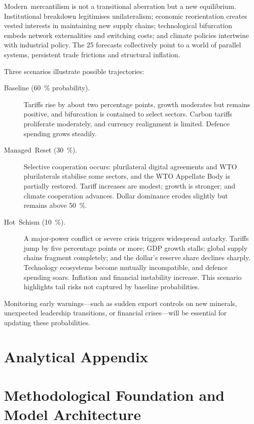 \documentclass{article}
\begin{document}
Modern mercantilism is not a transitional aberration but a new equilibrium.  Institutional breakdown legitimises unilateralism; economic reorientation creates vested interests in maintaining new supply chains; technological bifurcation embeds network externalities and switching costs; and climate policies intertwine with industrial policy.  The 25 forecasts collectively point to a world of parallel systems, persistent trade frictions and structural inflation.

Three scenarios illustrate possible trajectories:

\begin{description}
\item[Baseline (60 \% probability).]  Tariffs rise by about two percentage points, growth moderates but remains positive, and bifurcation is contained to select sectors.  Carbon tariffs proliferate moderately, and currency realignment is limited.  Defence spending grows steadily.

\item[Managed Reset (30 \%).]  Selective cooperation occurs: plurilateral digital agreements and WTO plurilaterals stabilise some sectors, and the WTO Appellate Body is partially restored.  Tariff increases are modest; growth is stronger; and climate cooperation advances.  Dollar dominance erodes slightly but remains above 50 \%.

\item[Hot Schism (10 \%).]  A major‑power conflict or severe crisis triggers widespread autarky.  Tariffs jump by five percentage points or more; GDP growth stalls; global supply chains fragment completely; and the dollar’s reserve share declines sharply.  Technology ecosystems become mutually incompatible, and defence spending soars.  Inflation and financial instability increase.  This scenario highlights tail risks not captured by baseline probabilities.
\end{description}

Monitoring early warnings—such as sudden export controls on new minerals, unexpected leadership transitions, or financial crises—will be essential for updating these probabilities.

\section{Analytical Appendix}

\section{Methodological Foundation and Model Architecture}
\end{document}
